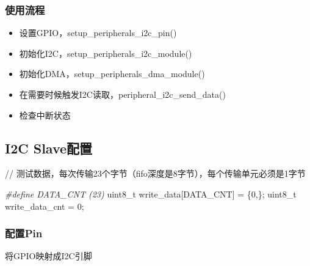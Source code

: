 \documentclass[
  12pt,
]{book}
\newenvironment{Shaded}{\begin{snugshade}}{\end{snugshade}}
\newcommand{\DataTypeTok}[1]{\textcolor[rgb]{0.13,0.29,0.53}{#1}}
\newcommand{\DecValTok}[1]{\textcolor[rgb]{0.00,0.00,0.81}{#1}}
\newcommand{\NormalTok}[1]{#1}
\newcommand{\PreprocessorTok}[1]{\textcolor[rgb]{0.56,0.35,0.01}{\textit{#1}}}
\providecommand{\tightlist}{%
  \setlength{\itemsep}{0pt}\setlength{\parskip}{0pt}}
\begin{document}
\hypertarget{ux4f7fux7528ux6d41ux7a0b-4}{%
\subsubsection{使用流程}\label{ux4f7fux7528ux6d41ux7a0b-4}}

\begin{itemize}
\tightlist
\item
  设置GPIO，setup\_peripherals\_i2c\_pin()
\item
  初始化I2C，setup\_peripherals\_i2c\_module()
\item
  初始化DMA，setup\_peripherals\_dma\_module()
\item
  在需要时候触发I2C读取，peripheral\_i2c\_send\_data()
\item
  检查中断状态
\end{itemize}

\hypertarget{i2c-slaveux914dux7f6e-2}{%
\subsection{I2C Slave配置}\label{i2c-slaveux914dux7f6e-2}}

// 测试数据，每次传输23个字节（fifo深度是8字节），每个传输单元必须是1字节

\begin{Shaded}
\begin{Highlighting}[]
\PreprocessorTok{#define DATA_CNT (23)}
\DataTypeTok{uint8_t}\NormalTok{ write_data[DATA_CNT] = \{}\DecValTok{0}\NormalTok{,\};}
\DataTypeTok{uint8_t}\NormalTok{ write_data_cnt = }\DecValTok{0}\NormalTok{;}
\end{Highlighting}
\end{Shaded}

\hypertarget{ux914dux7f6epin-5}{%
\subsubsection{配置Pin}\label{ux914dux7f6epin-5}}

将GPIO映射成I2C引脚
\end{document}
